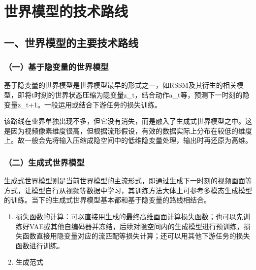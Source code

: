 \setcounter{section}{1}

\hypertarget{ux4e16ux754cux6a21ux578bux7684ux6280ux672fux8defux7ebf}{%
\section{世界模型的技术路线}\label{ux4e16ux754cux6a21ux578bux7684ux6280ux672fux8defux7ebf}}

\hypertarget{ux4e00ux4e16ux754cux6a21ux578bux7684ux4e3bux8981ux6280ux672fux8defux7ebf}{%
\subsection{一、世界模型的主要技术路线}\label{ux4e00ux4e16ux754cux6a21ux578bux7684ux4e3bux8981ux6280ux672fux8defux7ebf}}

\hypertarget{ux4e00ux57faux4e8eux9690ux53d8ux91cfux7684ux4e16ux754cux6a21ux578b}{%
\subsubsection{（一）基于隐变量的世界模型}\label{ux4e00ux57faux4e8eux9690ux53d8ux91cfux7684ux4e16ux754cux6a21ux578b}}

基于隐变量的世界模型是世界模型最早的形式之一，如RSSM及其衍生的相关模型，即将t时刻的世界状态压缩为隐变量z\_t，结合动作a\_t等，预测下一时刻的隐变量z\_t+1。一般运用或结合下游任务的损失训练。

该路线在业界单独出现不多，但它没有消失，而是融入了生成式世界模型之中。这是因为视频像素维度很高，但根据流形假设，有效的数据实际上分布在较低的维度上。故一般会先将输入压缩成隐空间中的低维隐变量处理，输出时再还原为高维。

\hypertarget{ux4e8cux751fux6210ux5f0fux4e16ux754cux6a21ux578b}{%
\subsubsection{（二）生成式世界模型}\label{ux4e8cux751fux6210ux5f0fux4e16ux754cux6a21ux578b}}

生成式世界模型则是当前世界模型的主流形式，即通过生成下一时刻的视频画面等方式，让模型自行从视频等数据中学习，其训练方法大体上可参考多模态生成模型的训练。当下的生成式世界模型基本都和基于隐变量的路线相结合。

\begin{enumerate}
\def\labelenumi{\arabic{enumi}.}
\item
  损失函数的计算：可以直接用生成的最终高维画面计算损失函数；也可以先训练好VAE或其他自编码器并冻结，后续对隐空间内的生成模型进行预训练，损失函数直接用隐变量对应的流匹配等损失计算；还可以用其他下游任务的损失函数进行训练。
\item
  生成范式
\end{enumerate}

